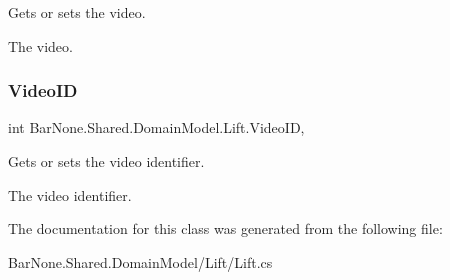 Gets or sets the video. 

The video. \mbox{\label{class_bar_none_1_1_shared_1_1_domain_model_1_1_lift_a17745b36465e201c64cbc3d4b3143244}} 
\subsubsection{\texorpdfstring{Video\+ID}{VideoID}}
{\footnotesize\ttfamily int Bar\+None.\+Shared.\+Domain\+Model.\+Lift.\+Video\+ID\hspace{0.3cm}{\ttfamily [get]}, {\ttfamily [set]}}



Gets or sets the video identifier. 

The video identifier. 

The documentation for this class was generated from the following file\+:\begin{DoxyCompactItemize}
\item 
Bar\+None.\+Shared.\+Domain\+Model/\+Lift/Lift.\+cs\end{DoxyCompactItemize}
